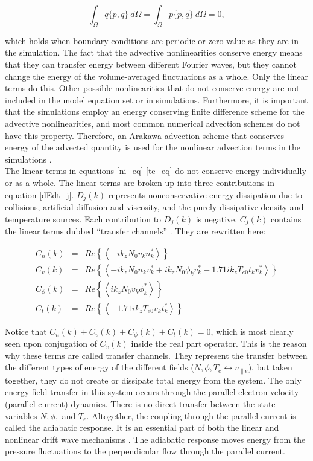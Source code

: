 \documentclass[12pt]{article}
\def\beq{\begin{equation}}
\def\eeq{\end{equation}}
\def\beqar{\begin{eqnarray}}
\def\eeqar{\end{eqnarray}}
\def\para{\parallel}
\begin{document}
\beq
\label{poisson_rln}
\int_\Omega q \{p,q\} \ d\Omega = \int_\Omega p \{p,q\} \ d\Omega = 0,
\eeq

which holds when boundary conditions are periodic or zero value as they are in the simulation. 
The fact that the advective nonlinearities conserve energy means that they can transfer energy between different Fourier waves,
but they cannot change the energy of the volume-averaged fluctuations as a whole. Only the linear terms do this.
Other possible nonlinearities that do not conserve energy are not included in the model equation set or in simulations. 
Furthermore, it is important that the simulations employ an energy conserving finite difference
scheme for the advective nonlinearities, and most common numerical advection schemes do not have this property. Therefore, an Arakawa advection scheme that conserves 
energy of the advected quantity is used for the nonlinear advection terms in the simulations \cite{arakawa1966}. \\

The linear terms in equations \ref{ni_eq}-\ref{te_eq} do not conserve energy individually or as a whole. The linear terms are broken up into three contributions in equation \ref{dEdt_j}.
$D_{j}(k)$ represents nonconservative energy dissipation due to collisions, artificial diffusion and viscosity, and the purely dissipative density and temperature sources.
Each contribution to $D_j(k)$ is negative. $C_j(k)$ contains the linear terms dubbed ``transfer channels'' \cite{scott2002}. They are rewritten here:

\beqar
C_n(k) & = & Re \left\{ \left< - i k_z N_0 v_k n_k^* \right> \right\}
\label{Cnk} \\
C_v(k) & = & Re \left\{ \left<  - i k_z N_0 n_k v_k^* + i k_z N_0 \phi_k v_k^* - 1.71 i k_z T_{e0} t_k v_k^*  \right> \right\}
\label{Cvk} \\
C_\phi(k) & = & Re \left\{ \left< i k_z N_0 v_k \phi_k^* \right> \right\}
\label{Cpk} \\
C_t(k) & = & Re \left\{ \left< - 1.71 i k_z T_{e0} v_k t_k^* \right> \right\}
\label{Ctk}
\eeqar

Notice that $C_n(k) + C_v(k) + C_\phi(k) + C_t(k) = 0$, which is most clearly seen upon conjugation of $C_v(k)$ inside the real part operator.
This is the reason why these terms are called transfer channels. They represent the transfer
between the different types of energy of the different fields ($N,\phi,T_e \leftrightarrow v_{\para e}$), but taken together, they do not create or dissipate total
energy from the system. The only energy field transfer in this system occurs through the parallel electron velocity (parallel current) dynamics. There is no direct transfer between
the state variables $N, \phi,$ and $T_e$.  Altogether, the coupling through the parallel current is called the
adiabatic response. It is an essential part of both the linear and nonlinear
drift wave mechanisms \cite{scott2002,scott2005}. The adiabatic response moves energy from the pressure fluctuations to the perpendicular flow through the parallel current. \\
\end{document}
